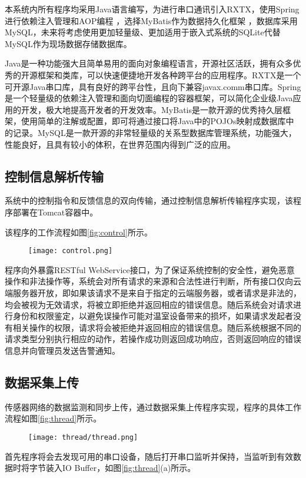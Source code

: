 本系统内所有程序均采用Java语言编写，为进行串口通讯引入RXTX，使用Spring进行依赖注入管理和AOP编程 ，选择MyBatis作为数据持久化框架 ，数据库采用MySQL，未来将考虑使用更加轻量级、更加适用于嵌入式系统的SQLite代替MySQL作为现场数据存储数据库。

Java是一种功能强大且简单易用的面向对象编程语言，开源社区活跃，拥有众多优秀的开源框架和类库，可以快速便捷地开发各种跨平台的应用程序\supercite{ThinkingInJava}。RXTX是一个可开源Java串口库，具有良好的跨平台性，且向下兼容javax.comm串口库。Spring是一个轻量级的依赖注入管理和面向切面编程的容器框架，可以简化企业级Java应用的开发，极大地提高开发者的开发效率\supercite{spring}。MyBatis是一款开源的优秀持久层框架，使用简单的注解或配置，即可将通过接口将Java中的POJOs映射成数据库中的记录\supercite{mybatis}。MySQL是一款开源的非常轻量级的关系型数据库管理系统，功能强大，性能良好，且具有较小的体积，在世界范围内得到广泛的应用。

	\subsection{控制信息解析传输}
系统中的控制指令和反馈信息的双向传输，通过控制信息解析传输程序实现，该程序部署在Tomcat容器中。
	
该程序的工作流程如图\ref{fig:control}所示。

	\begin{figure}[!htbp]
		\centering
		\texttt{[image: control.png]}
	\end{figure}
程序向外暴露RESTful WebService接口，为了保证系统控制的安全性，避免恶意操作和非法操作等，系统会对所有请求的来源和合法性进行判断，所有接口仅向云端服务器开放，即如果该请求不是来自于指定的云端服务器，或者请求是非法的，均会被视为无效请求，将被立即拒绝并返回相应的错误信息。随后系统会对请求进行身份和权限鉴定，以避免误操作可能对温室设备带来的损坏，如果请求发起者没有相关操作的权限，请求将会被拒绝并返回相应的错误信息。随后系统根据不同的请求类型分别执行相应的动作，若操作成功则返回成功响应，否则返回响应的错误信息并向管理员发送告警通知。

	\subsection{数据采集上传}
	传感器网络的数据监测和同步上传，通过数据采集上传程序实现，程序的具体工作流程如图\ref{fig:thread}所示。
	
	\begin{figure}[!htbp]
		\centering
		\texttt{[image: thread/thread.png]}
	\end{figure}
首先程序将会去发现可用的串口设备，随后打开串口监听并保持，当监听到有效数据时将字节装入IO Buffer，如图\ref{fig:thread}(a)所示。

